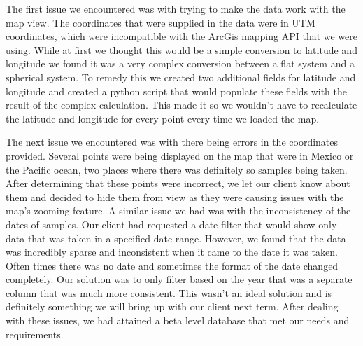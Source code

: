 \documentclass[10pt,draftclsnofoot,onecolumn]{IEEEtran}
\begin{document}
The first issue we encountered was with trying to make the data work with the map view.
The coordinates that were supplied in the data were in UTM coordinates, which were incompatible with the ArcGis mapping API that we were using.
While at first we thought this would be a simple conversion to latitude and longitude we found it was a very complex conversion between a flat system and a spherical system.
To remedy this we created two additional fields for latitude and longitude and created a python script that would populate these fields with the result of the complex calculation.
This made it so we wouldn't have to recalculate the latitude and longitude for every point every time we loaded the map.

The next issue we encountered was with there being errors in the coordinates provided.
Several points were being displayed on the map that were in Mexico or the Pacific ocean, two places where there was definitely so samples being taken.
After determining that these points were incorrect, we let our client know about them and decided to hide them from view as they were causing issues with the map's zooming feature.
A similar issue we had was with the inconsistency of the dates of samples.
Our client had requested a date filter that would show only data that was taken in a specified date range.
However, we found that the data was incredibly sparse and inconsistent when it came to the date it was taken.
Often times there was no date and sometimes the format of the date changed completely.
Our solution was to only filter based on the year that was a separate column that was much more consistent.
This wasn't an ideal solution and is definitely something we will bring up with our client next term.
After dealing with these issues, we had attained a beta level database that met our needs and requirements.
\end{document}
